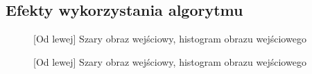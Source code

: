\documentclass[a4paper,12pt, titlepage]{report}
\begin{document}
\subsection*{Efekty wykorzystania algorytmu}
\begin{figure}[h]
    \centering
    \caption{[Od lewej] Szary obraz wejściowy, histogram obrazu wejściowego}%
    \label{fig:geo_after_grey1}%
\end{figure}
\FloatBarrier
\begin{figure}[h]
    \centering
    \caption{[Od lewej] Szary obraz wejściowy, histogram obrazu wejściowego}%
    \label{fig:geo_after_grey1}%
\end{figure}
\FloatBarrier
\end{document}
